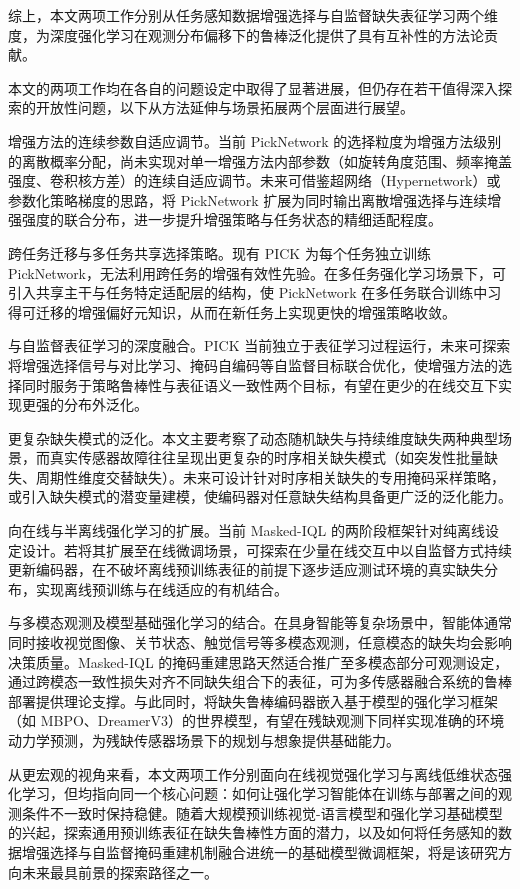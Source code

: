 综上，本文两项工作分别从任务感知数据增强选择与自监督缺失表征学习两个维度，为深度强化学习在观测分布偏移下的鲁棒泛化提供了具有互补性的方法论贡献。



本文的两项工作均在各自的问题设定中取得了显著进展，但仍存在若干值得深入探索的开放性问题，以下从方法延伸与场景拓展两个层面进行展望。


增强方法的连续参数自适应调节。当前 PickNetwork 的选择粒度为增强方法级别的离散概率分配，尚未实现对单一增强方法内部参数（如旋转角度范围、频率掩盖强度、卷积核方差）的连续自适应调节。未来可借鉴超网络（Hypernetwork）或参数化策略梯度的思路，将 PickNetwork 扩展为同时输出离散增强选择与连续增强强度的联合分布，进一步提升增强策略与任务状态的精细适配程度。

跨任务迁移与多任务共享选择策略。现有 PICK 为每个任务独立训练 PickNetwork，无法利用跨任务的增强有效性先验。在多任务强化学习场景下，可引入共享主干与任务特定适配层的结构，使 PickNetwork 在多任务联合训练中习得可迁移的增强偏好元知识，从而在新任务上实现更快的增强策略收敛。

与自监督表征学习的深度融合。PICK 当前独立于表征学习过程运行，未来可探索将增强选择信号与对比学习、掩码自编码等自监督目标联合优化，使增强方法的选择同时服务于策略鲁棒性与表征语义一致性两个目标，有望在更少的在线交互下实现更强的分布外泛化。


更复杂缺失模式的泛化。本文主要考察了动态随机缺失与持续维度缺失两种典型场景，而真实传感器故障往往呈现出更复杂的时序相关缺失模式（如突发性批量缺失、周期性维度交替缺失）。未来可设计针对时序相关缺失的专用掩码采样策略，或引入缺失模式的潜变量建模，使编码器对任意缺失结构具备更广泛的泛化能力。

向在线与半离线强化学习的扩展。当前 Masked-IQL 的两阶段框架针对纯离线设定设计。若将其扩展至在线微调场景，可探索在少量在线交互中以自监督方式持续更新编码器，在不破坏离线预训练表征的前提下逐步适应测试环境的真实缺失分布，实现离线预训练与在线适应的有机结合。

与多模态观测及模型基础强化学习的结合。在具身智能等复杂场景中，智能体通常同时接收视觉图像、关节状态、触觉信号等多模态观测，任意模态的缺失均会影响决策质量。Masked-IQL 的掩码重建思路天然适合推广至多模态部分可观测设定，通过跨模态一致性损失对齐不同缺失组合下的表征，可为多传感器融合系统的鲁棒部署提供理论支撑。与此同时，将缺失鲁棒编码器嵌入基于模型的强化学习框架（如 MBPO、DreamerV3）的世界模型，有望在残缺观测下同样实现准确的环境动力学预测，为残缺传感器场景下的规划与想象提供基础能力。


从更宏观的视角来看，本文两项工作分别面向在线视觉强化学习与离线低维状态强化学习，但均指向同一个核心问题：如何让强化学习智能体在训练与部署之间的观测条件不一致时保持稳健。随着大规模预训练视觉-语言模型和强化学习基础模型的兴起，探索通用预训练表征在缺失鲁棒性方面的潜力，以及如何将任务感知的数据增强选择与自监督掩码重建机制融合进统一的基础模型微调框架，将是该研究方向未来最具前景的探索路径之一。
